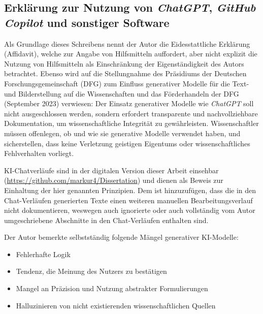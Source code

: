 

%
\label{sec:Additional_Methods}%



\subsection*{Erklärung zur Nutzung von \textit{ChatGPT}, \textit{GitHub Copilot} und sonstiger Software}

Als Grundlage dieses Schreibens nennt der Autor die Eidesstattliche Erklärung
(Affidavit), welche zur Angabe von Hilfsmitteln auffordert, aber nicht explizit
die Nutzung von Hilfsmitteln als Einschränkung der Eigenständigkeit des Autors
betrachtet. Ebenso wird auf die Stellungnahme des Präsidiums der Deutschen
Forschungsgemeinschaft (DFG) zum Einfluss generativer Modelle für die Text- und
Bilderstellung auf die Wissenschaften und das Förderhandeln der DFG (September
2023) verwiesen: Der Einsatz generativer Modelle wie \textit{ChatGPT} soll nicht
ausgeschlossen werden, sondern erfordert transparente und nachvollziehbare
Dokumentation, um wissenschaftliche Integrität zu gewährleisten. Wissenschaftler
müssen offenlegen, ob und wie sie generative Modelle verwendet haben, und
sicherstellen, dass keine Verletzung geistigen Eigentums oder wissenschaftliches
Fehlverhalten vorliegt.

KI-Chatverläufe sind in der digitalen Version dieser Arbeit einsehbar
(\url{https://github.com/markur4/Dissertation}) und dienen als Beweis zur
Einhaltung der hier genannten Prinzipien. Dem ist hinzuzufügen, dass die in den
Chat-Verläufen generierten Texte einen weiteren manuellen Bearbeitungsverlauf
nicht dokumentieren, weswegen auch ignorierte oder auch vollständig vom Autor
umgeschriebene Abschnitte in den Chat-Verläufen enthalten sind.

\noindent Der Autor bemerkte selbstständig folgende Mängel generativer KI-Modelle:
\begin{itemize}
    \item Fehlerhafte Logik
    \item Tendenz, die Meinung des Nutzers zu bestätigen
    \item Mangel an Präzision und Nutzung abstrakter Formulierungen
    \item Halluzinieren von nicht existierenden wissenschaftlichen Quellen
\end{itemize}

